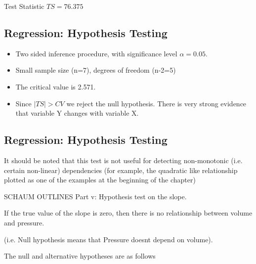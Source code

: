 \documentclass[]{report}
\begin{document}
	
	Test Statistic $TS = 76.375$
	
	
	\subsection{Regression: Hypothesis Testing}
	\begin{itemize}
		\item Two sided inference procedure, with significance level $\alpha=0.05$.
		\item Small sample size (n=7), degrees of freedom (n-2=5)
		\item The critical value is 2.571.
		\item Since $|TS|>CV$  we reject the null hypothesis. There is very strong evidence
		that variable Y changes with variable X.
	\end{itemize}
	
	
	\subsection{Regression: Hypothesis Testing}
	It should be noted that this test is not useful for detecting
	non-monotonic (i.e. certain non-linear) dependencies (for example,
	the quadratic like relationship plotted as one of the examples at
	the beginning of the chapter)
	
	SCHAUM OUTLINES
\newpage
		Part v: Hypothesis test on the slope.
		
		
		If the true value of the slope is zero, then there is no relationship between volume and pressure.
		
		(i.e. Null hypothesis means that Pressure doesnt depend on volume).
		
		
		The null and alternative hypotheses are as follows
		
\end{document}

